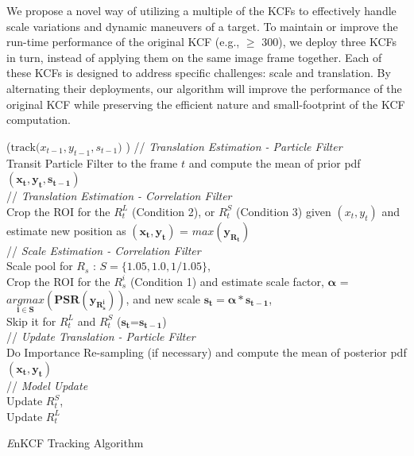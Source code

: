 \documentclass[10pt,twocolumn,letterpaper]{article}
\begin{document}
We propose a novel way of utilizing a multiple of the KCFs
\cite{henriques2015high} to effectively handle scale variations and
dynamic maneuvers of a target. To maintain or improve the run-time
performance of the original KCF (e.g., $\ge$ 300), we deploy three
KCFs in turn, instead of applying them on the same image frame
together. Each of these KCFs is designed to address specific
challenges: scale and translation. By alternating their deployments,
our algorithm will improve the performance of the original KCF while
preserving the efficient nature and small-footprint of the KCF
computation.

\begin{algorithm*}[h]
\small
\DontPrintSemicolon
{}
\Begin($\text{track($x_{t-1},y_{t-1},s_{t-1}$) }$)
{
 	// \textit{Translation Estimation - Particle Filter} \\
	Transit Particle Filter to the frame $t$ and compute the mean of prior pdf $\mathbf{(x_{t},y_{t},s_{t-1})}$ \\
     // \textit{Translation Estimation - Correlation Filter} \\
	Crop the ROI for the $R_{t}^{L}$ (Condition 2), or $R_{t}^{S}$ (Condition 3) given $(x_{t},y_{t})$ and estimate new position as $\mathbf{(x_{t},y_{t})}$ = $\mathbf{\textit{max}(y_{R_{t}})}$\\
	// \textit{Scale Estimation - Correlation Filter}\\
	Scale pool for $R_{s}$ : $S = \lbrace1.05,1.0,1/1.05\rbrace$,\\
	Crop the ROI for the $R_{s}^{i}$ (Condition 1) and estimate scale factor, $\mathbf{\alpha}$ = $\mathbf{\underset{i\in S}{\textit{argmax}}(PSR(y_{R_{s}^{i}}))}$, and new scale $\mathbf{s_{t} = \alpha * s_{t-1}}$,\\ 
	Skip it for $R_{t}^{L}$ and $R_{t}^{S}$ ($\mathbf{s_{t}}$=$\mathbf{s_{t-1}}$)\\
	// \textit{Update Translation - Particle Filter}\\
	Do Importance Re-sampling (if necessary) and compute the 
	mean of posterior pdf $\mathbf{(x_{t},y_{t})}$\\
	// \textit{Model Update}\\
	Update $R_{t}^{S}$,\\
	Update $R_{t}^{L}$\\
  \label{endfor}
}
\caption{{\it E}nKCF Tracking Algorithm}\label{alg:MKCF}
\end{algorithm*}
\end{document}

